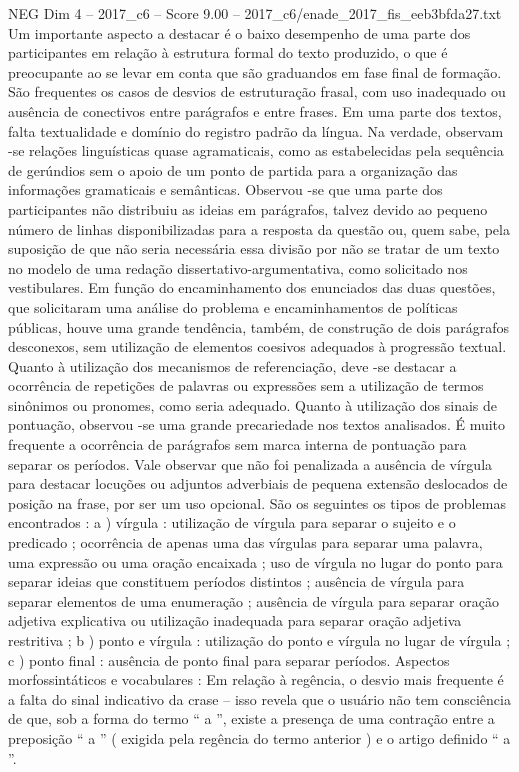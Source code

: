 \begin{textsample}{NEG Dim 4 – 2017\_c6 – Score 9.00 – 2017\_c6/enade\_2017\_fis\_eeb3bfda27.txt}
Um importante aspecto a destacar é o baixo desempenho de uma parte dos participantes em relação à estrutura formal do texto produzido, o que é preocupante ao se levar em conta que são graduandos em fase final de formação.
São frequentes os casos de desvios de estruturação frasal, com uso inadequado ou ausência de conectivos entre parágrafos e entre frases.
Em uma parte dos textos, falta textualidade e domínio do registro padrão da língua.
Na verdade, observam -se relações linguísticas quase agramaticais, como as estabelecidas pela sequência de gerúndios sem o apoio de um ponto de partida para a organização das informações gramaticais e semânticas.
Observou -se que uma parte dos participantes não distribuiu as ideias em parágrafos, talvez devido ao pequeno número de linhas disponibilizadas para a resposta da questão ou, quem sabe, pela suposição de que não seria necessária essa divisão por não se tratar de um texto no modelo de uma redação dissertativo-argumentativa, como solicitado nos vestibulares.
Em função do encaminhamento dos enunciados das duas questões, que solicitaram uma análise do problema e encaminhamentos de políticas públicas, houve uma grande tendência, também, de construção de dois parágrafos desconexos, sem utilização de elementos coesivos adequados à progressão textual.
Quanto à utilização dos mecanismos de referenciação, deve -se destacar a ocorrência de repetições de palavras ou expressões sem a utilização de termos sinônimos ou pronomes, como seria adequado.
Quanto à utilização dos sinais de pontuação, observou -se uma grande precariedade nos textos analisados.
É muito frequente a ocorrência de parágrafos sem marca interna de pontuação para separar os períodos.
Vale observar que não foi penalizada a ausência de vírgula para destacar locuções ou adjuntos adverbiais de pequena extensão deslocados de posição na frase, por ser um uso opcional.
São os seguintes os tipos de problemas encontrados : a ) vírgula : utilização de vírgula para separar o sujeito e o predicado ; ocorrência de apenas uma das vírgulas para separar uma palavra, uma expressão ou uma oração encaixada ; uso de vírgula no lugar do ponto para separar ideias que constituem períodos distintos ; ausência de vírgula para separar elementos de uma enumeração ; ausência de vírgula para separar oração adjetiva explicativa ou utilização inadequada para separar oração adjetiva restritiva ; b ) ponto e vírgula : utilização do ponto e vírgula no lugar de vírgula ; c ) ponto final : ausência de ponto final para separar períodos.
Aspectos morfossintáticos e vocabulares : Em relação à regência, o desvio mais frequente é a falta do sinal indicativo da crase – isso revela que o usuário não tem consciência de que, sob a forma do termo “ a ”, existe a presença de uma contração entre a preposição “ a ” ( exigida pela regência do termo anterior ) e o artigo definido “ a ”.

\end{textsample}
